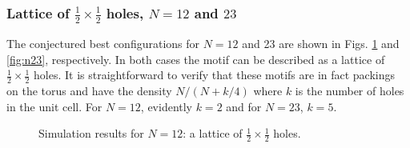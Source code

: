 \documentclass[preprint,aps]{revtex4}
\begin{document}
\subsubsection{Lattice of $\frac{1}{2}\times\frac{1}{2}$ holes, $N=12$ and $23$}
The conjectured best configurations for $N=12$ and 23 are shown in Figs. \ref{fig:n12} and \ref{fig:n23}, respectively.  In both cases the motif can be described as a lattice of $\frac{1}{2}\times\frac{1}{2}$ holes. It is straightforward to verify that these motifs are in fact packings on the torus and have the density $N/(N+k/4)$ where $k$ is the number of holes in the unit cell.  For $N=12$, evidently $k=2$ and for $N=23$, $k=5$. 

\begin{figure}[H]
\caption{\label{fig:n12}Simulation results for $N=12$: a lattice of $\frac{1}{2} \times \frac{1}{2}$ holes.}
\end{figure}
\end{document}
